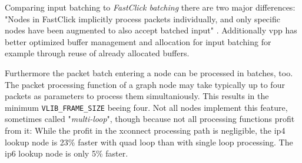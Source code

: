 Comparing input batching to \textit{FastClick batching} there are two major
differences: "Nodes in FastClick implicitly process packets
individually, and only specific nodes have been augmented to also
accept batched input" \cite{linguaglossa2017high}. Additionally
\Ac{vpp} has better optimized buffer management and allocation for
input batching for example through reuse of already allocated buffers.
\cite{linguaglossa2017high}

Furthermore the packet batch entering a node can be processed in
batches, too. The packet processing function of a graph node may take
typically up to four packets as parameters to process them
simultaniously. This results in the minimum
\lstinline|VLIB_FRAME_SIZE| beeing four. Not all nodes implement this
feature, sometimes called "\textit{multi-loop}", though because not
all processing functions profit from it: While the profit in the
xconnect processing path is negligible, the \Ac{ip4} lookup node is
23\% faster with quad loop than with single loop processing. The
\Ac{ip6} lookup node is only 5\% faster.



